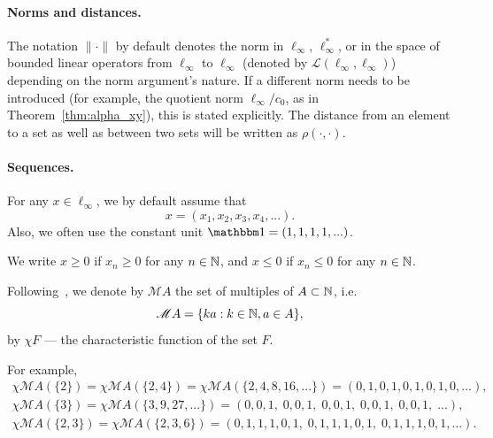 \paragraph{Norms and distances.}
The notation \(\|\cdot\|\) by default denotes the norm in \(\ell_\infty\), \(\ell_\infty^*\),
or in the space of bounded linear operators from \(\ell_\infty\) to \(\ell_\infty\)
(denoted by \(\mathcal L (\ell_\infty, \ell_\infty)\)) depending on the norm argument's nature.
If a different norm needs to be introduced (for example, the quotient norm \(\ell_\infty / c_0\),
as in Theorem~\ref{thm:alpha_xy}), this is stated explicitly.
The distance from an element to a set as well as between two sets will be written as $\rho(\cdot, \cdot)$.

\paragraph{Sequences.}
For any \(x\in\ell_\infty\), we by default assume that
\begin{equation}
	x=(x_1, x_2, x_3, x_4, ...)
	.
\end{equation}
Also, we often use the constant unit \(\one = (1, 1, 1, 1, ...)\).

We write \(x\geq 0\) if \(x_n \geq 0\) for any \(n\in \mathbb{N}\), and \(x\leq 0\) if \(x_n \leq 0\) for any \(n\in \mathbb{N}\).

Following~\cite{hall1992behrend}, we denote by \(\mathscr{M}A\) the set of multiples of \(A\subset\mathbb{N}\), i.e.
\begin{equation}
	\mathscr{M}A = \{ka: k\in\mathbb{N}, a\in A\}
	,
\end{equation}
by \(\chi F\) — the characteristic function of the set \(F\).

For example,
\begin{gather}
	\chi \mathscr{M}\!A(\{2\}) = \chi \mathscr{M}\!A(\{2, 4\}) = \chi \mathscr{M}\!A(\{2,4,8,16,...\})
	= (0,1,0,1,0,1,0,1,0,...),
\\
	\chi \mathscr{M}\!A(\{3\}) = \chi \mathscr{M}\!A(\{3,9,27,...\}) = (0,0,1,\;0,0,1,\;0,0,1,\;0,0,1,\;0,0,1,\;...),
\\
	\chi \mathscr{M}\!A(\{2,3\}) = \chi \mathscr{M}\!A(\{2,3,6\}) = (0,1,1,1,0,1,\;0,1,1,1,0,1,\;0,1,1,1,0,1,...).
\end{gather}

